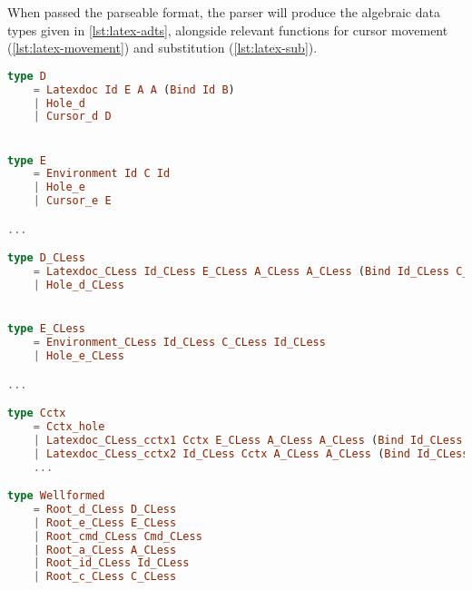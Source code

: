 When passed the parseable format, the parser will produce the algebraic data types
given in \cref{lst:latex-adts}, alongside relevant functions for cursor movement (\cref{lst:latex-movement})
and substitution (\cref{lst:latex-sub}).

\begin{lstlisting}[style=inline, language=elm, caption={Generated ADT for the \LaTeX \ language}, label={lst:latex-adts}]
type D
    = Latexdoc Id E A A (Bind Id B)
    | Hole_d
    | Cursor_d D


type E
    = Environment Id C Id
    | Hole_e
    | Cursor_e E

...

type D_CLess
    = Latexdoc_CLess Id_CLess E_CLess A_CLess A_CLess (Bind Id_CLess C_CLess)
    | Hole_d_CLess


type E_CLess
    = Environment_CLess Id_CLess C_CLess Id_CLess
    | Hole_e_CLess

...

type Cctx
    = Cctx_hole
    | Latexdoc_CLess_cctx1 Cctx E_CLess A_CLess A_CLess (Bind Id_CLess B_CLess)
    | Latexdoc_CLess_cctx2 Id_CLess Cctx A_CLess A_CLess (Bind Id_CLess B_CLess)
    ...

type Wellformed
    = Root_d_CLess D_CLess
    | Root_e_CLess E_CLess
    | Root_cmd_CLess Cmd_CLess
    | Root_a_CLess A_CLess
    | Root_id_CLess Id_CLess
    | Root_c_CLess C_CLess

\end{lstlisting}

